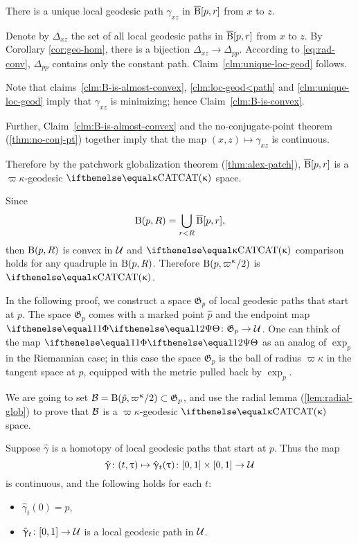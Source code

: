 \begin{clm}{}\label{clm:unique-loc-geod}
There is a unique local geodesic path $\gamma_{x z}$ in $\overline{\mathrm{B}}{}[ p,r]$ from $x$ to $z$.
\end{clm}

Denote by $\Delta_{x z}$ the set of all local geodesic paths in $\overline{\mathrm{B}}{}[ p,r]$ from $x$ to $z$.
By Corollary \ref{cor:geo-hom}, there is a  bijection $\Delta_{x z}\to\Delta_{p p}$.
According to \ref{eq:rad-conv}, 
$\Delta_{p p}$ contains only the constant path.
Claim~\ref{clm:unique-loc-geod} follows.


Note that 
claims~\ref{clm:B-is-almost-convex}, 
\ref{clm:loc-geod<path} 
and \ref{clm:unique-loc-geod}
imply that $\gamma_{x z}$ is minimizing; hence Claim~\ref{clm:B-is-convex}.

Further, Claim~\ref{clm:B-is-almost-convex} and the no-conjugate-point theorem (\ref{thm:no-conj-pt}) together 
imply that the map $(x,z)\mapsto\gamma_{x z}$ is continuous.

Therefore by the patchwork globalization theorem (\ref{thm:alex-patch}), 
$\overline{\mathrm{B}}{}[ p,r]$ is a $\varpi\kappa$-geodesic $\CAT\kappa$ space.

Since
\[\mathrm{B}{}( p,R)
=
\bigcup_{r < R}\overline{\mathrm{B}}{}[ p,r],\] 
then $\mathrm{B}{}( p,R)$ is convex in $\mathcal{U}$ and 
$\CAT\kappa$ comparison holds  for any quadruple in $\mathrm{B}{}( p,R)$.
Therefore $\oBall( p,\varpi\kappa/2)$ is $\CAT\kappa$.
\qeds


In the following proof, we construct a space $\mathfrak{G}_p$ of  local geodesic paths that start at $p$.
The space $\mathfrak{G}_p$ comes with 
a marked point $\hat p$ 
and the endpoint map $\map\:\mathfrak{G}_p\to\spc{U}$.
One can think of
the map $\map$ as an analog of $\exp_p$ in the Riemannian case; in this case
the space $\mathfrak{G}_p$ is the ball of radius $\varpi\kappa$ in the tangent space at $p$, equipped with the metric pulled back by $\exp_p$.

We are going to set $\spc{B}=\oBall(\hat p,\varpi\kappa/2)\subset \mathfrak{G}_p$,
and use the radial lemma (\ref{lem:radial-glob}) to prove that $\mathcal{B}$ is a $\varpi\kappa$-geodesic $\CAT\kappa$ space.

Suppose $\hat\gamma$ is a homotopy of local geodesic paths that start at $p$.  Thus the map 
\[\hat\gamma\:(t,\tau)\mapsto\hat\gamma_t(\tau)\:[0,1]\times[0,1]\to\spc{U}\] 
is continuous,
and the following holds for each $t$:
\begin{itemize}
\item $\hat\gamma_t(0)=p$,
\item $\hat\gamma_t\:[0,1]\to\spc{U}$ is a local geodesic path in $\mathcal{U}$.
\end{itemize}

